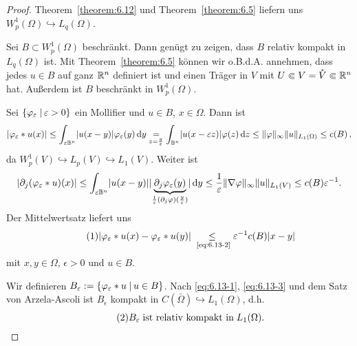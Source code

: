 \begin{proof}
  Theorem~\ref{theorem:6.12} und Theorem~\ref{theorem:6.5} liefern uns $W_p^1(\Omega)\hookrightarrow L_q(\Omega)$.

  Sei $B\subset W_p^1(\Omega)$ beschränkt. Dann genügt zu zeigen, dass $B$ relativ kompakt in $L_q(\Omega)$ ist. Mit Theorem~\ref{theorem:6.5} können wir o.B.d.A. annehmen, dass jedes $u\in B$ auf ganz $\mathbb{R}^n$ definiert ist und einen Träger in $V$ mit $U\Subset V=\mathring V\Subset\mathbb{R}^n$ hat. Außerdem ist $B$ beschränkt in $W_p^1(\Omega)$.

  Sei $\{\varphi_\varepsilon\;\vert\,\varepsilon>0\}$ ein Mollifier und $u\in B$, $x\in\Omega$. Dann ist
  \begin{dmath}
    \label{eq:6.13-1}
    \abs{\varphi_\epsilon\ast u(x)}\leq \int_{\epsilon\B^n}\abs{u(x-y)}\varphi_\epsilon(y)\d y 
    \underset{z=\frac y\epsilon}{=}\int_{\B^n}\abs{u(x-\epsilon z)}\varphi(z)\d z 
    \leq\norm\varphi_\infty\norm u_{L_1(\Omega)}\leq c(B)\, ,
  \end{dmath}
  da $W_p^1(V)\hookrightarrow L_p(V)\hookrightarrow L_1(V)$. Weiter ist
  \begin{dmath}
    \label{eq:6.13-2}
    \abs{\partial_j(\varphi_\epsilon\ast u)(x)}
    \leq\int_{\epsilon\B^n}\abs{u(x-y)}\abs{\underbrace{\partial_j\varphi_\epsilon(y)}_{\frac 1\epsilon(\partial_j\varphi)(\frac y\epsilon)}}\d y
    \leq\frac 1\epsilon\norm{\nabla\varphi}_\infty\norm u_{L_1(V)}\leq c(B)\epsilon^{-1}.
  \end{dmath}
  Der Mittelwertsatz liefert uns
  \[
  \eq{eq:6.13-3}
  \abs{\varphi_\epsilon\ast u(x)-\varphi_\epsilon\ast u(y)}
  \underset{\scriptsize ~\eqref{eq:6.13-2}}\leq\epsilon^{-1}c(B)\abs{x-y}
  \]
  mit $x,y\in\Omega$, $\epsilon>0$ und $u\in B$. 

  Wir definieren $B_\varepsilon:=\{\varphi_\varepsilon\ast u\;\vert\, u\in B\}$. Nach \eqref{eq:6.13-1}, \eqref{eq:6.13-3} und dem Satz von Arzela-Ascoli ist $B_\epsilon$ kompakt in $C(\bar\Omega)\hookrightarrow L_1(\Omega)$, d.h.
  \[
  \eq{eq:6.13-4}
 B_\epsilon\;\text{ist relativ kompakt in}\;L_1(\Omega).
 \]


\end{proof}
